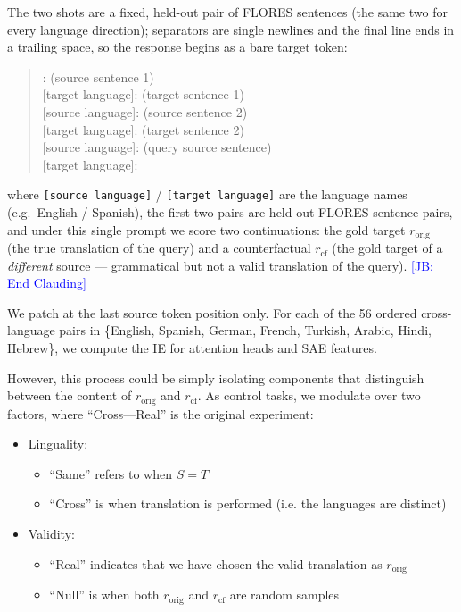 \documentclass[11pt]{article}
\newcommand{\jb}[1]{\textcolor{blue}{[JB: #1]}}
\begin{document}
The two shots are a fixed, held-out pair of FLORES sentences (the same two for
every language direction); separators are single newlines and the final line
ends in a trailing space, so the response begins as a bare target token:
\begin{quote}: (source sentence 1)\\
{}[target language]: (target sentence 1)\\
{}[source language]: (source sentence 2)\\
{}[target language]: (target sentence 2)\\
{}[source language]: (query source sentence)\\
{}[target language]:
\end{quote}
where \texttt{[source language]} / \texttt{[target language]} are the language
names (e.g.\ English / Spanish), the first two pairs are held-out FLORES sentence
pairs, and under this single prompt we score two continuations: the gold target
$r_{\text{orig}}$ (the true translation of the query) and a counterfactual
$r_{\text{cf}}$ (the gold target of a \emph{different} source --- grammatical but
not a valid translation of the query).
\jb{End Clauding}

We patch at the last source token position only. For each of the 56 ordered cross-language pairs in \{English, Spanish, German, French, Turkish, Arabic, Hindi, Hebrew\}, we compute the IE for attention heads and SAE features.

However, this process could be simply isolating components that distinguish between the content of $r_{\text{orig}}$ and $r_{\text{cf}}$. As control tasks, we modulate over two factors, where ``Cross---Real'' is the original experiment:
\begin{itemize}
    \item Linguality:
    \begin{itemize}
        \item ``Same'' refers to when $S=T$
        \item ``Cross'' is when translation is performed (i.e. the languages are distinct)
    \end{itemize}
    \item Validity: 
    \begin{itemize}
        \item ``Real'' indicates that we have chosen the valid translation as $r_{\text{orig}}$
        \item ``Null'' is when both $r_{\text{orig}}$ and $r_{\text{cf}}$ are random samples
    \end{itemize}
\end{itemize}
\end{document}
